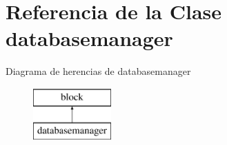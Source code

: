 \hypertarget{classdatabasemanager}{\section{\-Referencia de la \-Clase databasemanager}
\label{classdatabasemanager}
}
\-Diagrama de herencias de databasemanager\begin{figure}[H]
\begin{center}
\leavevmode
\includegraphics[height=2.000000cm]{classdatabasemanager}
\end{center}
\end{figure}
